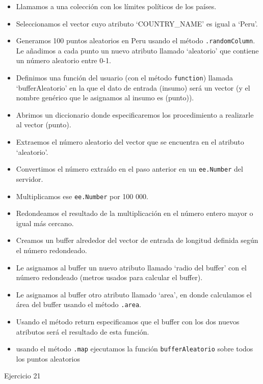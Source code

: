 \documentclass[
  12pt,
  letterpaper,
  twoside]{book}
\providecommand{\tightlist}{%
  \setlength{\itemsep}{0pt}\setlength{\parskip}{0pt}}
\begin{document}
\begin{itemize}
\tightlist
\item
  Llamamos a una colección con los límites políticos de los países.
\item
  Seleccionamos el vector cuyo atributo `COUNTRY\_NAME' es igual a `Peru'.
\item
  Generamos 100 puntos aleatorios en Peru usando el método \texttt{.randomColumn}. Le añadimos a cada punto un nuevo atributo llamado `aleatorio' que contiene un número aleatorio entre 0-1.
\item
  Definimos una función del usuario (con el método \texttt{function}) llamada `bufferAleatorio' en la que el dato de entrada (insumo) será un vector (y el nombre genérico que le asignamos al insumo es (punto)).
\item
  Abrimos un diccionario donde especificaremos los procedimiento a realizarle al vector (punto).
\item
  Extraemos el número aleatorio del vector que se encuentra en el atributo `aleatorio'.
\item
  Convertimos el número extraído en el paso anterior en un \texttt{ee.Number} del servidor.
\item
  Multiplicamos ese \texttt{ee.Number} por 100 000.
\item
  Redondeamos el resultado de la multiplicación en el número entero mayor o igual más cercano.
\item
  Creamos un buffer alrededor del vector de entrada de longitud definida según el número redondeado.
\item
  Le asignamos al buffer un nuevo atributo llamado `radio del buffer' con el número redondeado (metros usados para calcular el buffer).
\item
  Le asignamos al buffer otro atributo llamado `area', en donde calculamos el área del buffer usando el método \texttt{.area}.
\item
  Usando el método return especificamos que el buffer con los dos nuevos atributos será el resultado de esta función.
\item
  usando el método \texttt{.map} ejecutamos la función \texttt{bufferAleatorio} sobre todos los puntos aleatorios
\end{itemize}

Ejercicio 21
\end{document}
